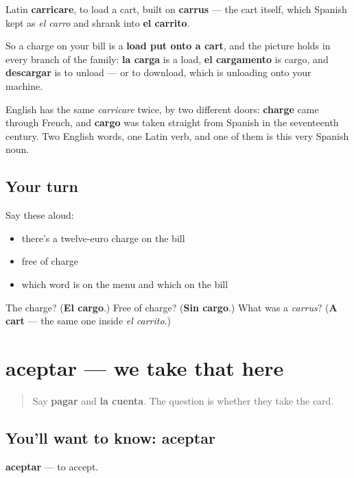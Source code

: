 \begin{cousinweb}
Latin \textbf{carricare}, to load a cart, built on \textbf{carrus} — the cart itself, which Spanish kept as \emph{el carro} and shrank into \textbf{el carrito}.

So a charge on your bill is a \textbf{load put onto a cart}, and the picture holds in every branch of the family: \textbf{la carga} is a load, \textbf{el cargamento} is cargo, and \textbf{descargar} is to unload — or to download, which is unloading onto your machine.

English has the same \emph{carricare} twice, by two different doors: \textbf{charge} came through French, and \textbf{cargo} was taken straight from Spanish in the seventeenth century. Two English words, one Latin verb, and one of them is this very Spanish noun.
\end{cousinweb}

\subsection*{Your turn}
Say these aloud:

\begin{itemize}
\raggedright
  \item there's a twelve-euro charge on the bill
  \item free of charge
  \item which word is on the menu and which on the bill
\end{itemize}

\begin{tcolorbox}[breakable,colback=teal!4,colframe=teal!35!black,title={Before you move on}]
The charge? (\textbf{El cargo}.) Free of charge? (\textbf{Sin cargo}.) What was a \emph{carrus}? (\textbf{A cart} — the same one inside \emph{el carrito}.)
\end{tcolorbox}
\section[aceptar]{aceptar — we take that here}

\label{lesson:ES-C456-aceptar}



\begin{quote}
Say \textbf{pagar} and \textbf{la cuenta}. The question is whether they take the card.
\end{quote}

\subsection*{You'll want to know: aceptar}
\textbf{aceptar} — to accept.

